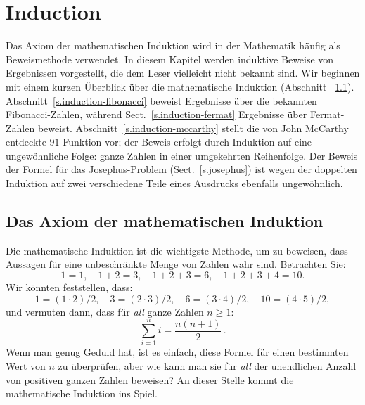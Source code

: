 
\chapter{Induction}\label{c.induction}


Das Axiom der mathematischen Induktion wird in der Mathematik häufig als Beweismethode verwendet. In diesem Kapitel werden induktive Beweise von Ergebnissen vorgestellt, die dem Leser vielleicht nicht bekannt sind. Wir beginnen mit einem kurzen Überblick über die mathematische Induktion (Abschnitt ~\ref{s.induction-axiom}). Abschnitt~\ref{s.induction-fibonacci} beweist Ergebnisse über die bekannten Fibonacci-Zahlen, während Sect.~\ref{s.induction-fermat} Ergebnisse über Fermat-Zahlen beweist. Abschnitt~\ref{s.induction-mccarthy} stellt die von John McCarthy entdeckte $91$-Funktion vor; der Beweis erfolgt durch Induktion auf eine ungewöhnliche Folge: ganze Zahlen in einer umgekehrten Reihenfolge. Der Beweis der Formel für das Josephus-Problem (Sect.~\ref{s.josephus}) ist wegen der doppelten Induktion auf zwei verschiedene Teile eines Ausdrucks ebenfalls ungewöhnlich.

\section{Das Axiom der mathematischen Induktion}\label{s.induction-axiom}

Die mathematische Induktion ist die wichtigste Methode, um zu beweisen, dass Aussagen für eine unbeschränkte Menge von Zahlen wahr sind. Betrachten Sie:
\[
1=1,\quad 1+2=3,\quad 1+2+3=6,\quad 1+2+3+4=10.
\]
Wir könnten feststellen, dass:
\[
1=(1\cdot 2)/2,\quad 3=(2\cdot 3)/2,\quad 6=(3\cdot 4)/2,\quad 10=(4\cdot 5)/2,
\]
und vermuten dann, dass für \emph{all} ganze Zahlen $n\geq 1$:
\[
\sum_{i=1}^n i = \frac{n(n+1)}{2}\,.
\]
Wenn man genug Geduld hat, ist es einfach, diese Formel für einen bestimmten Wert von $n$ zu überprüfen, aber wie kann man sie für \emph{all} der unendlichen Anzahl von positiven ganzen Zahlen beweisen? An dieser Stelle kommt die mathematische Induktion ins Spiel.

